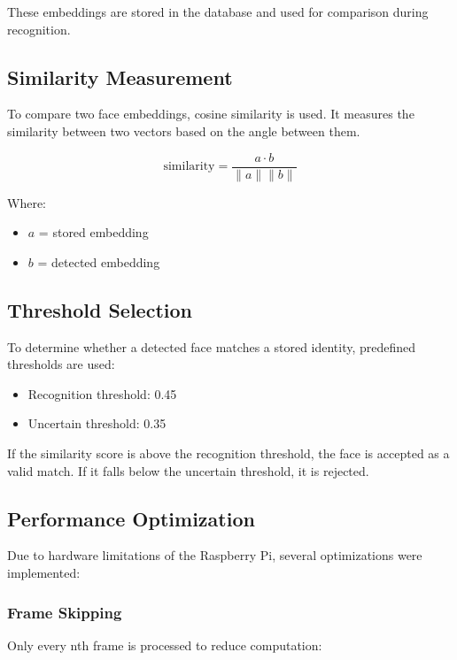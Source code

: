 These embeddings are stored in the database and used for comparison during recognition.

\subsection{Similarity Measurement}

To compare two face embeddings, cosine similarity is used. It measures the similarity between two vectors based on the angle between them.

\begin{equation}
\text{similarity} = \frac{a \cdot b}{\|a\| \|b\|}
\end{equation}

Where:
\begin{itemize}
    \item $a$ = stored embedding
    \item $b$ = detected embedding
\end{itemize}

\subsection{Threshold Selection}

To determine whether a detected face matches a stored identity, predefined thresholds are used:

\begin{itemize}
    \item Recognition threshold: 0.45
    \item Uncertain threshold: 0.35
\end{itemize}

If the similarity score is above the recognition threshold, the face is accepted as a valid match. If it falls below the uncertain threshold, it is rejected.

\subsection{Performance Optimization}

Due to hardware limitations of the Raspberry Pi, several optimizations were implemented:

\subsubsection{Frame Skipping}

Only every nth frame is processed to reduce computation:

